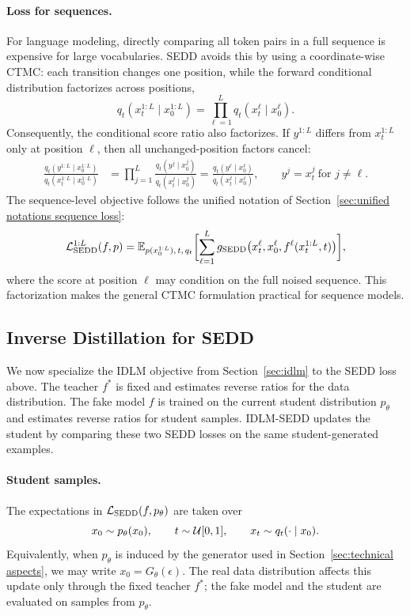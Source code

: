 \paragraph{Loss for sequences.}
For language modeling, directly comparing all token pairs in a full sequence is expensive for large vocabularies. SEDD avoids this by using a coordinate-wise CTMC: each transition changes one position, while the forward conditional distribution factorizes across positions,
\[
    q_t(x_t^{1:L}\mid x_0^{1:L})
    =
    \prod_{\ell=1}^{L}q_t(x_t^\ell\mid x_0^\ell).
\]
Consequently, the conditional score ratio also factorizes. If $y^{1:L}$ differs from $x_t^{1:L}$ only at position $\ell$, then all unchanged-position factors cancel:
\[
\begin{aligned}
    \frac{q_t(y^{1:L}\mid x_0^{1:L})}
         {q_t(x_t^{1:L}\mid x_0^{1:L})}
    &=
    \prod_{j=1}^{L}
    \frac{q_t(y^j\mid x_0^j)}
         {q_t(x_t^j\mid x_0^j)}
    =
    \frac{q_t(y^\ell\mid x_0^\ell)}
         {q_t(x_t^\ell\mid x_0^\ell)},
    \qquad y^j=x_t^j\ \text{for }j\neq \ell .
\end{aligned}
\]
The sequence-level objective follows the unified notation of Section~\ref{sec:unified notations sequence loss}:
\[
    \mathcal{L}_{\mathrm{SEDD}}^{1:L}(f,p)
    =
    \mathbb{E}_{p(x_0^{1:L}),\,t,\,q_t}
    \biggl[
    \sum_{\ell=1}^{L}
    g_{\mathrm{SEDD}}
    \bigl(x_t^\ell,x_0^\ell,f^\ell(x_t^{1:L},t)\bigr)
    \biggr],
\]
where the score at position $\ell$ may condition on the full noised sequence. This factorization makes the general CTMC formulation practical for sequence models.

\subsection{\texorpdfstring{Inverse Distillation for SEDD}{Inverse Distillation for SEDD}}
\label{app:sedd-reverse-distillation}

We now specialize the IDLM objective from Section~\ref{sec:idlm} to the SEDD loss above. The teacher $f^*$ is fixed and estimates reverse ratios for the data distribution. The fake model $f$ is trained on the current student distribution $p_\theta$ and estimates reverse ratios for student samples. IDLM-SEDD updates the student by comparing these two SEDD losses on the same student-generated examples.

\paragraph{Student samples.}
The expectations in $\mathcal{L}_{\mathrm{SEDD}}(f,p_\theta)$ are taken over
\[
    x_0\sim p_\theta(x_0),
    \qquad
    t\sim\mathcal{U}[0,1],
    \qquad
    x_t\sim q_t(\cdot\mid x_0).
\]
Equivalently, when $p_\theta$ is induced by the generator used in Section~\ref{sec:technical aspects}, we may write $x_0=G_\theta(\epsilon)$. The real data distribution affects this update only through the fixed teacher $f^*$; the fake model and the student are evaluated on samples from $p_\theta$.

